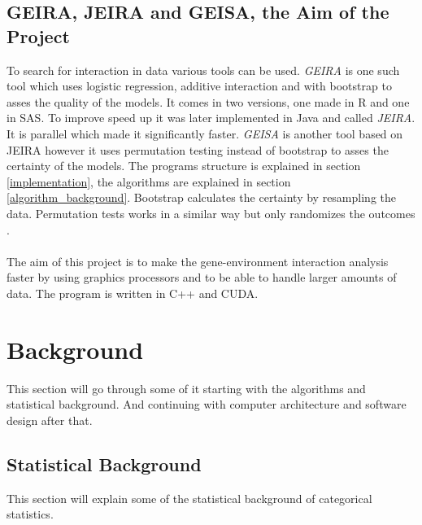 \documentclass[10pt,a4paper]{report}
\begin{document}
\section{GEIRA, JEIRA and GEISA, the Aim of the Project}
\label{jeira}
To search for interaction in data various tools can be used. \emph{GEIRA}\cite{geira} is one such tool which uses logistic regression, additive interaction and with bootstrap to asses the quality of the models\cite{geira}. It comes in two versions, one made in R and one in SAS. To improve speed up it was later implemented in Java and called \emph{JEIRA}\cite{uvehag_master_thesis}. It is parallel which made it significantly faster\cite{uvehag_master_thesis}. \emph{GEISA}\cite{geisa} is another tool based on JEIRA however it uses permutation testing instead of bootstrap to asses the certainty of the models\cite{geisa}. The programs structure is explained in section \ref{implementation}, the algorithms are explained in section \ref{algorithm_background}. Bootstrap calculates the certainty by resampling the data\cite{agresti_categorical}. Permutation tests works in a similar way but only randomizes the outcomes \cite{lindgren1993statistical}.\\
\\
The aim of this project is to make the gene-environment interaction analysis faster by using graphics processors and to be able to handle larger amounts of data. The program is written in C++ and CUDA.


\clearpage
\chapter{Background}
This section will go through some of it starting with the algorithms and statistical background. And continuing with computer architecture and software design after that.

\section{Statistical Background}
This section will explain some of the statistical background of categorical statistics.
\end{document}
